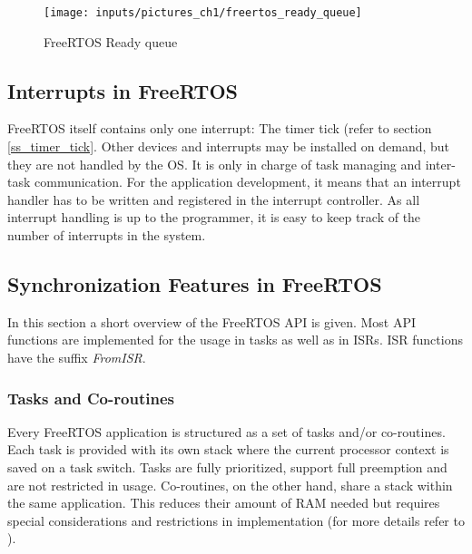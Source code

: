 \begin{figure}[htb]
	\begin{center}
		\texttt{[image: inputs/pictures\_ch1/freertos\_ready\_queue]}
	\end{center}
	\caption[FreeRTOS Ready queue]{FreeRTOS Ready queue} \label{fig_freertos_ready_queue}
\end{figure}

\subsection{Interrupts in FreeRTOS}\label{ss_interrupts_in_freertos}
FreeRTOS itself contains only one interrupt: The timer tick (refer to section \ref{ss_timer_tick}.
Other devices and interrupts may be installed on demand, but they are not handled by the OS. 
It is only in charge of task managing and inter-task communication.
For the application development, it means that an interrupt handler has to be written and registered in the interrupt controller.
As all interrupt handling is up to the programmer, it is easy to keep track of the number of interrupts in the system.

\subsection{Synchronization Features in FreeRTOS}
In this section a short overview of the FreeRTOS \ac{API} is given.
Most \ac{API} functions are implemented for the usage in tasks as well as in \acp{ISR}.
\ac{ISR} functions have the suffix \textit{FromISR}.

\subsubsection{Tasks and Co-routines}
Every FreeRTOS application is structured as a set of tasks and/or co-routines.
Each task is provided with its own stack where the current processor context is saved on a task switch.
Tasks are fully prioritized, support full preemption and are not restricted in usage.
Co-routines, on the other hand, share a stack within the same application. 
This reduces their amount of \ac{RAM} needed but requires special considerations and restrictions in implementation (for more details refer to \cite{freertos_coroutines_tasks}).


